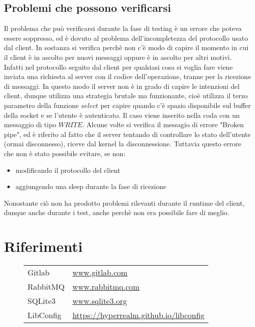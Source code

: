 \documentclass[]{article}
\begin{document}
\subsection{Problemi che possono verificarsi}
Il problema che pu\`o verificarsi durante la fase di testing \`e un errore che poteva essere soppresso,
ed \`e dovuto al problema dell'incompletezza del protocollo usato dal client.
In sostanza si verifica perch\`e non c'\`e modo di capire il momento in cui il client \`e in ascolto per nuovi
messaggi oppure \`e in ascolto per altri motivi.
Infatti nel protocollo seguito dal client per qualsiasi cosa si voglia fare viene inviata una richiesta
al server con il codice dell'operazione, tranne per la ricezione di messaggi.
In questo modo il server non \`e in grado di capire le intenzioni del client, dunque utilizza una
strategia brutale ma funzionante, cio\`e utilizza il terzo parametro della funzione $select$ per capire
quando c'\`e spazio disponibile sul buffer della socket e se l'utente \`e autenticato. Il caso
viene inserito nella coda con un messaggio di tipo $WRITE$. Alcune volte si verifica il messagio di 
errore "Broken pipe", ed \`e riferito al fatto che il server tentando di controllare lo stato dell'utente
(ormai disconnesso), riceve dal kernel la disconnessione.
Tuttavia questo errore che non \`e stato possibile evitare, se non:
\begin{itemize}
	\item modificando il protocollo del client
	\item aggiungendo una sleep durante la fase di ricezione
\end{itemize}
Nonostante ci\`o non ha prodotto problemi rilevanti durante il runtime del client, dunque anche durante i test,
anche perch\`e non era possibile fare di meglio.

\pagebreak

\section{Riferimenti}
\begin{figure}[H]
	\begin{table}[H]
		\begin{tabular}{ll}
			Gitlab & \url{www.gitlab.com} \\
			RabbitMQ & \url{www.rabbitmq.com} \\
			SQLite3 & \url{www.sqlite3.org} \\
			LibConfig & \url{https://hyperrealm.github.io/libconfig} \\
		\end{tabular}
	\end{table}
\end{figure}
\end{document}
